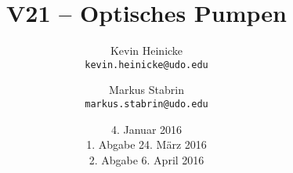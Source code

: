 


\title{%
    V21 -- Optisches Pumpen
}
\author{%
    Kevin Heinicke\\
    \texttt{kevin.heinicke@udo.edu}
    \and
    Markus Stabrin\\
    \texttt{markus.stabrin@udo.edu}
}
\date{%
    4. Januar 2016\\
    {\small 1. Abgabe} 24. März 2016\\
    {\small 2. Abgabe} 6. April 2016\\
}

    \maketitle%
    \tableofcontents
    \newpage
    
    

    \printbibliography

